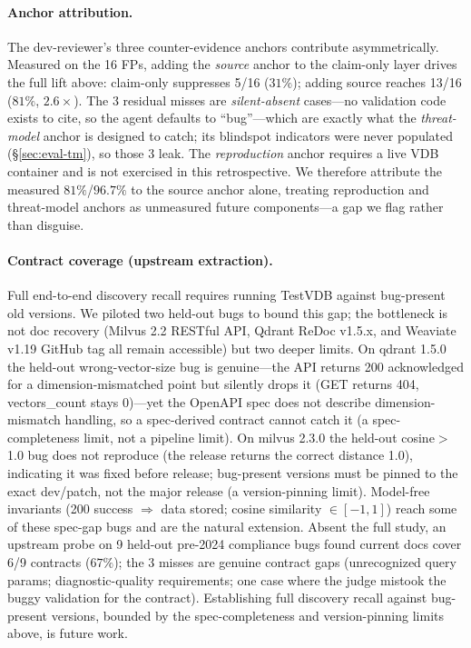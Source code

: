 \documentclass[sigconf]{acmart}
\begin{document}
\paragraph{Anchor attribution.} The dev-reviewer's three counter-evidence anchors contribute asymmetrically. Measured on the 16 FPs, adding the \emph{source} anchor to the claim-only layer drives the full lift above: claim-only suppresses 5/16 ($31\%$); adding source reaches 13/16 ($81\%$, $2.6\times$). The 3 residual misses are \emph{silent-absent} cases---no validation code exists to cite, so the agent defaults to ``bug''---which are exactly what the \emph{threat-model} anchor is designed to catch; its blindspot indicators were never populated (\S\ref{sec:eval-tm}), so those 3 leak. The \emph{reproduction} anchor requires a live VDB container and is not exercised in this retrospective. We therefore attribute the measured $81\%$/$96.7\%$ to the source anchor alone, treating reproduction and threat-model anchors as unmeasured future components---a gap we flag rather than disguise.

\paragraph{Contract coverage (upstream extraction).} Full end-to-end discovery recall requires running TestVDB against bug-present old versions. We piloted two held-out bugs to bound this gap; the bottleneck is not doc recovery (Milvus 2.2 RESTful API, Qdrant ReDoc v1.5.x, and Weaviate v1.19 GitHub tag all remain accessible) but two deeper limits. On qdrant 1.5.0 the held-out wrong-vector-size bug is genuine---the API returns 200 acknowledged for a dimension-mismatched point but silently drops it (GET returns 404, vectors\_count stays 0)---yet the OpenAPI spec does not describe dimension-mismatch handling, so a spec-derived contract cannot catch it (a spec-completeness limit, not a pipeline limit). On milvus 2.3.0 the held-out cosine$>$1.0 bug does not reproduce (the release returns the correct distance 1.0), indicating it was fixed before release; bug-present versions must be pinned to the exact dev/patch, not the major release (a version-pinning limit). Model-free invariants (200 success $\Rightarrow$ data stored; cosine similarity $\in [-1,1]$) reach some of these spec-gap bugs and are the natural extension. Absent the full study, an upstream probe on 9 held-out pre-2024 compliance bugs found current docs cover 6/9 contracts ($67\%$); the 3 misses are genuine contract gaps (unrecognized query params; diagnostic-quality requirements; one case where the judge mistook the buggy validation for the contract). Establishing full discovery recall against bug-present versions, bounded by the spec-completeness and version-pinning limits above, is future work.
\end{document}
